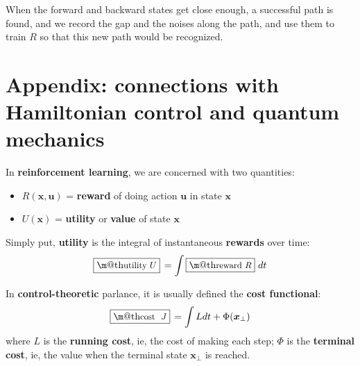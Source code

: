 \documentclass[orivec]{llncs}
\makeatletter
\newcommand{\emp}[1]{\textbf{#1}}
\newcommand{\vect}[1]{\boldsymbol{#1}}
\renewcommand{\boxed}[1]{\fbox{\m@th$\displaystyle\scalebox{0.9}{#1}$} \,}
\makeatother
\begin{document}
When the forward and backward states get close enough, a successful path is found, and we record the gap and the noises along the path, and use them to train $R$ so that this new path would be recognized.




\fi

\section*{Appendix:  connections with Hamiltonian control and quantum mechanics}
	
	In \emp{reinforcement learning}, we are concerned with two quantities:
	\let\labelitemi\labelitemii
	\begin{itemize}
		\item $R(\vect{x}, \vect{u})$ = \emp{reward} of doing action $\vect{u}$ in state $\vect{x}$
		\item $U(\vect{x})$ = \emp{utility} or \emp{value} of state $\vect{x}$ 
	\end{itemize}
	Simply put, \textbf{utility} is the integral of instantaneous \textbf{rewards} over time:
	\begin{equation}
	\boxed{\mbox{utility} $U$} = \int \boxed{\mbox{reward} $R$} \,dt
	\end{equation}
	
	In \emp{control-theoretic} parlance, it is usually defined the \textbf{cost functional}:
	\begin{equation}
	\boxed{\mbox{cost } $J$} = \int L dt + \Phi(\vect{x}_\bot)
	\end{equation}
	where $L$ is the \textbf{running cost}, ie, the cost of making each step; $\Phi$ is the \textbf{terminal cost}, ie, the value when the terminal state $\vect{x}_\bot$ is reached.
	
\end{document}
